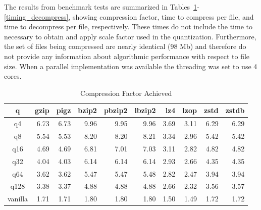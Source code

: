 The results from benchmark tests are summarized in Tables~\ref{compress_factor}-\ref{timing_decompress}, 
showing compression factor, time to compress per file, and time to decompress per file, respectively.
These times do not include the time to necessary to obtain and apply scale factor used in the quantization.  Furthermore, the set of files being compressed are nearly identical (98 Mb) and therefore do not provide 
any information about algorithmic performance with respect to file size.  When a parallel implementation
was available the threading was set to use 4 cores.


\begin{table}
\caption{Compression Factor Achieved}
\centering
\begin{tabular}[]{crrrrrrrrr}
\hline
 q        &  gzip & pigz & bzip2 & pbzip2 & lbzip2 & lz4 & lzop & zstd & zstdb  \\
\hline
 q4       &   6.73 &  6.73 &  9.96 &  9.95 &  9.96 &  3.69 &  3.11 &  6.29 &  6.29  \\
 q8       &   5.54 &  5.53 &  8.20 &  8.20 &  8.21 &  3.34 &  2.96 &  5.42 &  5.42  \\
 q16      &   4.69 &  4.69 &  6.81 &  7.01 &  7.03 &  3.11 &  2.82 &  4.82 &  4.82  \\
 q32      &   4.04 &  4.03 &  6.14 &  6.14 &  6.14 &  2.93 &  2.66 &  4.35 &  4.35  \\
 q64      &   3.62 &  3.62 &  5.47 &  5.47 &  5.48 &  2.82 &  2.47 &  3.94 &  3.94  \\
 q128     &   3.38 &  3.37 &  4.88 &  4.88 &  4.88 &  2.66 &  2.32 &  3.56 &  3.57  \\
 vanilla  &   1.71 &  1.71 &  1.80 &  1.80 &  1.80 &  1.50 &  1.49 &  1.72 &  1.72  \\
\hline
\end{tabular}
\label{compress_factor}
\end{table}


